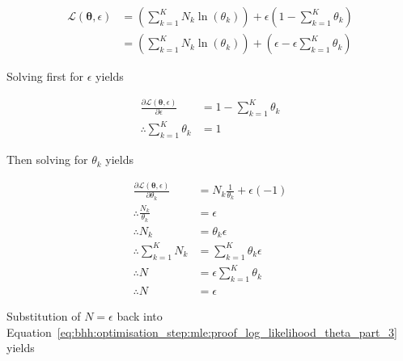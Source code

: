 \begin{equation}
      \label{eq:bhh:optimisation_step:mle:proof_log_likelihood_theta_part_1}
      \begin{split}
            \mathcal{L}(\boldsymbol{\theta}, \epsilon)
            &=  \left( \sum_{k=1}^{K} N_{k} \ln \left( \theta_{k} \right) \right) + \epsilon \left( 1 - \sum_{k=1}^{K} \theta_{k} \right) \\
            &=  \left( \sum_{k=1}^{K} N_{k} \ln \left( \theta_{k} \right) \right) + \left( \epsilon -  \epsilon \sum_{k=1}^{K} \theta_{k} \right)
      \end{split}
\end{equation}

Solving first for $\epsilon$ yields

\begin{equation}
      \label{eq:bhh:optimisation_step:mle:proof_log_likelihood_theta_part_2}
      \begin{split}
            \frac{\partial \mathcal{L}(\boldsymbol{\theta}, \epsilon)}{\partial \epsilon} &= 1 - \sum_{k=1}^{K} \theta_{k}  \\
            \therefore \sum_{k=1}^{K} \theta_{k}  &= 1
      \end{split}
\end{equation}

Then solving for $\theta_{k}$ yields

\begin{equation}
      \label{eq:bhh:optimisation_step:mle:proof_log_likelihood_theta_part_3}
      \begin{split}
            \frac{\partial \mathcal{L}(\boldsymbol{\theta}, \epsilon)}{\partial \theta_{k}} &=  N_{k} \frac{1}{\theta_{k}}  + \epsilon(-1) \\
            \therefore \frac{N_{k}}{\theta_{k}} &= \epsilon \\
            \therefore N_{k} &= \theta_{k} \epsilon \\
            \therefore \sum_{k=1}^{K} N_{k} &= \sum_{k=1}^{K} \theta_{k} \epsilon \\
            \therefore N &= \epsilon \sum_{k=1}^{K} \theta_{k} \\
            \therefore N &= \epsilon
      \end{split}
\end{equation}

Substitution of $N = \epsilon$ back into Equation~\eqref{eq:bhh:optimisation_step:mle:proof_log_likelihood_theta_part_3} yields

